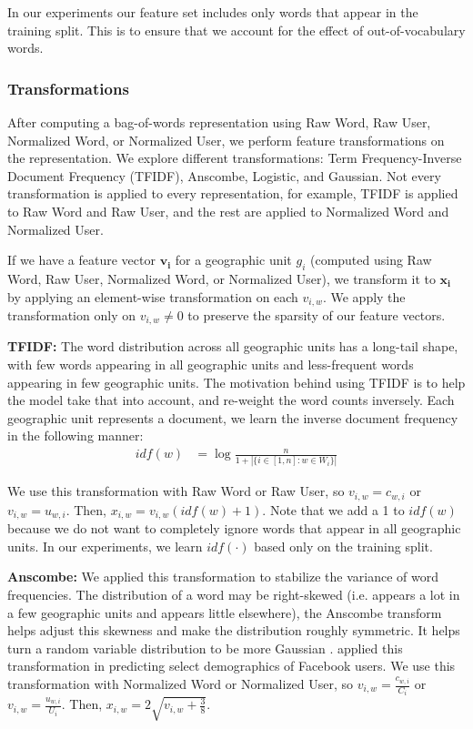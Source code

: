\documentclass[letterpaper]{article}
\begin{document}
In our experiments our feature set includes only words that appear in the training split. This is to ensure that we account for the effect of out-of-vocabulary words.

\subsubsection{Transformations} After computing a bag-of-words representation using Raw Word, Raw User, Normalized Word, or Normalized User, we perform feature transformations on the representation. We explore different transformations: Term Frequency-Inverse Document Frequency (TFIDF), Anscombe, Logistic, and Gaussian. Not every transformation is applied to every representation, for example, TFIDF is applied to Raw Word and Raw User, and the rest are applied to Normalized Word and Normalized User.

If we have a feature vector $\mathbf{v_i}$ for a geographic unit $g_i$ (computed using Raw Word, Raw User, Normalized Word, or Normalized User), we transform it to $\mathbf{x_i}$ by applying an element-wise transformation on each $v_{i,w}$. We apply the transformation only on $v_{i,w}\neq0$ to preserve the sparsity of our feature vectors.

\textbf{TFIDF:} The word distribution across all geographic units has a long-tail shape, with few words appearing in all geographic units and less-frequent words appearing in few geographic units. The motivation behind using TFIDF is to help the model take that into account, and re-weight the word counts inversely. Each geographic unit represents a document, we learn the inverse document frequency in the following manner:
\begin{align*}
    idf(w) &= \log \frac{n}{1 + |\{i \in [1,n]: w \in W_i\}|}
\end{align*}

We use this transformation with Raw Word or Raw User, so $v_{i,w} = c_{w,i}$ or $v_{i,w} = u_{w,i}$. Then, $x_{i,w} = v_{i,w}( idf(w) + 1 )$. Note that we add a 1 to $idf(w)$ because we do not want to completely ignore words that appear in all geographic units. In our experiments, we learn $idf(\cdot)$ based only on the training split.

\textbf{Anscombe:} We applied this transformation to stabilize the variance of word frequencies. The distribution of a word may be right-skewed (i.e. appears a lot in a few geographic units and appears little elsewhere), the Anscombe transform helps adjust this skewness and make the distribution roughly symmetric. It helps turn a random variable distribution to be more Gaussian \cite{anscombe1948transformation}. \citeauthor{schwartz2013personality}  applied this transformation in predicting select demographics of Facebook users. We use this transformation with Normalized Word or Normalized User, so $v_{i,w} = \frac{c_{w,i}}{C_i}$ or $v_{i,w} = \frac{u_{w,i}}{U_i}$. Then, $x_{i,w} = 2\sqrt{v_{i,w} + \frac{3}{8}} $.
\end{document}

